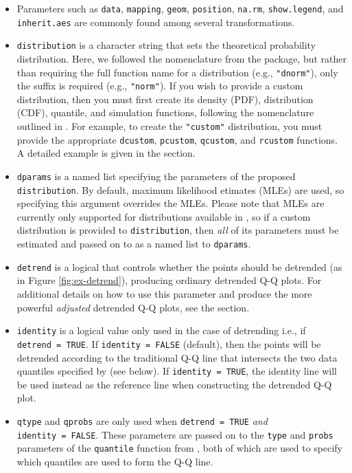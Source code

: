 \begin{itemize}
\item
  Parameters such as \texttt{data}, \texttt{mapping}, \texttt{geom},
  \texttt{position}, \texttt{na.rm}, \texttt{show.legend}, and
  \texttt{inherit.aes} are commonly found among several 
  transformations.
\item
  \texttt{distribution} is a character string that sets the theoretical
  probability distribution. Here, we followed the nomenclature from the
   package, but rather than requiring the full function name
  for a distribution (e.g., \texttt{"dnorm"}), only the suffix is
  required (e.g., \texttt{"norm"}). If you wish to provide a custom
  distribution, then you must first create its density (PDF),
  distribution (CDF), quantile, and simulation functions, following the
  nomenclature outlined in . For example, to create the
  \texttt{"custom"} distribution, you must provide the appropriate
  \texttt{dcustom}, \texttt{pcustom}, \texttt{qcustom}, and
  \texttt{rcustom} functions. A detailed example is given in the
   section.
\item
  \texttt{dparams} is a named list specifying the parameters of the
  proposed \texttt{distribution}. By default, maximum likelihood
  etimates (MLEs) are used, so specifying this argument overrides the
  MLEs. Please note that MLEs are currently only supported for
  distributions available in , so if a custom distribution is
  provided to \texttt{distribution}, then \emph{all} of its parameters
  must be estimated and passed on to as a named list to
  \texttt{dparams}.
\item
  \texttt{detrend} is a logical that controls whether the points should
  be detrended (as in Figure \ref{fig:ex-detrend}), producing ordinary
  detrended Q-Q plots. For additional details on how to use this
  parameter and produce the more powerful \emph{adjusted} detrended Q-Q
  plots, see the  section.
\item
  \texttt{identity} is a logical value only used in the case of
  detrending i.e., if \texttt{detrend\ =\ TRUE}. If
  \texttt{identity\ =\ FALSE} (default), then the points will be
  detrended according to the traditional Q-Q line that intersects the
  two data quantiles specified by  (see below). If
  \texttt{identity\ =\ TRUE}, the identity line will be used instead as
  the reference line when constructing the detrended Q-Q plot.
\item
  \texttt{qtype} and \texttt{qprobs} are only used when
  \texttt{detrend\ =\ TRUE} \emph{and} \texttt{identity\ =\ FALSE}.
  These parameters are passed on to the \texttt{type} and \texttt{probs}
  parameters of the \texttt{quantile} function from , both of
  which are used to specify which quantiles are used to form the Q-Q
  line.
\end{itemize}

